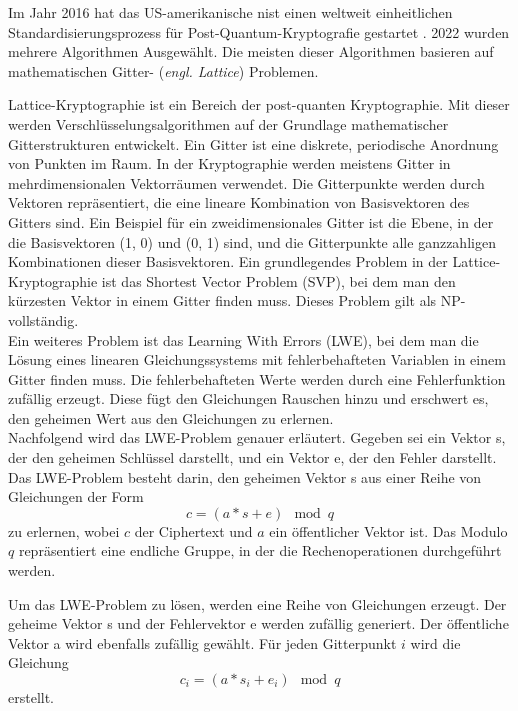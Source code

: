 Im Jahr 2016 hat das US-amerikanische \ac{nist} einen weltweit einheitlichen Standardisierungsprozess für Post-Quantum-Kryptografie gestartet \cite{moodyStatusReportThird2022}.
2022 wurden mehrere Algorithmen Ausgewählt. Die meisten dieser Algorithmen basieren auf mathematischen Gitter- (\textit{engl. Lattice}) Problemen.

Lattice-Kryptographie \cite{micciancioLatticebasedCryptography} ist ein Bereich der post-quanten Kryptographie. 
Mit dieser werden Verschlüsselungsalgorithmen auf der Grundlage mathematischer Gitterstrukturen entwickelt. 
Ein Gitter ist eine diskrete, periodische Anordnung von Punkten im Raum. In der Kryptographie werden meistens Gitter in mehrdimensionalen Vektorräumen verwendet.
Die Gitterpunkte werden durch Vektoren repräsentiert, die eine lineare Kombination von Basisvektoren des Gitters sind. 
Ein Beispiel für ein zweidimensionales Gitter ist die Ebene, in der die Basisvektoren (1, 0) und (0, 1) sind, 
und die Gitterpunkte alle ganzzahligen Kombinationen dieser Basisvektoren.
Ein grundlegendes Problem in der Lattice-Kryptographie ist das Shortest Vector Problem (SVP), bei dem man den kürzesten Vektor in einem Gitter finden muss. 
Dieses Problem gilt als NP-vollständig. \cite[Abs. 2.1]{wangLatticebasedCryptosystemsStandardisation2023}\\

Ein weiteres Problem ist das Learning With Errors (LWE), bei dem man die Lösung eines linearen Gleichungssystems mit fehlerbehafteten Variablen in einem Gitter finden muss.
Die fehlerbehafteten Werte werden durch eine Fehlerfunktion zufällig erzeugt. 
Diese fügt den Gleichungen Rauschen hinzu und erschwert es, den geheimen Wert aus den Gleichungen zu erlernen.\\

Nachfolgend wird das LWE-Problem genauer erläutert.
Gegeben sei ein Vektor s, der den geheimen Schlüssel darstellt, und ein Vektor e, der den Fehler darstellt. 
Das LWE-Problem besteht darin, den geheimen Vektor s aus einer Reihe von Gleichungen der Form 
$$c = (a * s + e)\mod{q}$$ zu erlernen, wobei $c$ der Ciphertext und $a$ ein öffentlicher Vektor ist. 
Das Modulo $q$ repräsentiert eine endliche Gruppe, in der die Rechenoperationen durchgeführt werden.

Um das LWE-Problem zu lösen, werden eine Reihe von Gleichungen erzeugt. Der geheime Vektor s und der Fehlervektor e werden zufällig generiert. 
Der öffentliche Vektor a wird ebenfalls zufällig gewählt. Für jeden Gitterpunkt $i$ wird die Gleichung 
$$c_i = (a * s_i + e_i) \mod{q}$$ 
erstellt.

